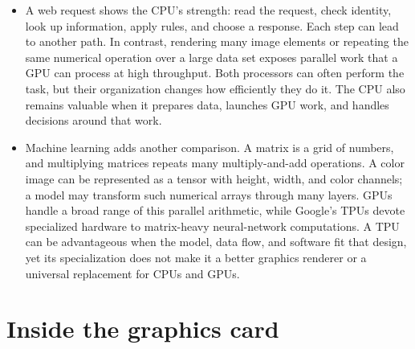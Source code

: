 \documentclass[10pt]{article}
\begin{document}
\begin{itemize}[leftmargin=1.25em, itemsep=0.3em, parsep=0pt, topsep=0pt]
    \item A web request shows the CPU's strength: read the request, check identity, look up information, apply rules, and choose a response. Each step can lead to another path. In contrast, rendering many image elements or repeating the same numerical operation over a large data set exposes parallel work that a GPU can process at high throughput. Both processors can often perform the task, but their organization changes how efficiently they do it. The CPU also remains valuable when it prepares data, launches GPU work, and handles decisions around that work.

    \item Machine learning adds another comparison. A matrix is a grid of numbers, and multiplying matrices repeats many multiply-and-add operations. A color image can be represented as a tensor with height, width, and color channels; a model may transform such numerical arrays through many layers. GPUs handle a broad range of this parallel arithmetic, while Google's TPUs devote specialized hardware to matrix-heavy neural-network computations. A TPU can be advantageous when the model, data flow, and software fit that design, yet its specialization does not make it a better graphics renderer or a universal replacement for CPUs and GPUs.
\end{itemize}

\newpage
\section*{Inside the graphics card}
\end{document}
